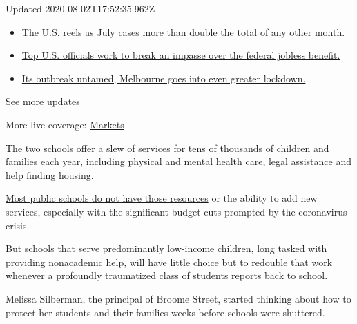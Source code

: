 Updated 2020-08-02T17:52:35.962Z

\begin{itemize}
\tightlist
\item
  \href{https://www.nytimes3xbfgragh.onion/2020/08/01/world/coronavirus-covid-19.html?action=click\&pgtype=Article\&state=default\&region=MAIN_CONTENT_1\&context=storylines_live_updates\#link-34047410}{The
  U.S. reels as July cases more than double the total of any other
  month.}
\item
  \href{https://www.nytimes3xbfgragh.onion/2020/08/01/world/coronavirus-covid-19.html?action=click\&pgtype=Article\&state=default\&region=MAIN_CONTENT_1\&context=storylines_live_updates\#link-780ec966}{Top
  U.S. officials work to break an impasse over the federal jobless
  benefit.}
\item
  \href{https://www.nytimes3xbfgragh.onion/2020/08/01/world/coronavirus-covid-19.html?action=click\&pgtype=Article\&state=default\&region=MAIN_CONTENT_1\&context=storylines_live_updates\#link-2bc8948}{Its
  outbreak untamed, Melbourne goes into even greater lockdown.}
\end{itemize}

\href{https://www.nytimes3xbfgragh.onion/2020/08/01/world/coronavirus-covid-19.html?action=click\&pgtype=Article\&state=default\&region=MAIN_CONTENT_1\&context=storylines_live_updates}{See
more updates}

More live coverage:
\href{https://www.nytimes3xbfgragh.onion/live/2020/07/31/business/stock-market-today-coronavirus?action=click\&pgtype=Article\&state=default\&region=MAIN_CONTENT_1\&context=storylines_live_updates}{Markets}

The two schools offer a slew of services for tens of thousands of
children and families each year, including physical and mental health
care, legal assistance and help finding housing.

\href{https://www.nytimes3xbfgragh.onion/2020/07/14/us/coronavirus-schools-fall.html}{Most
public schools do not have those resources} or the ability to add new
services, especially with the significant budget cuts prompted by the
coronavirus crisis.

But schools that serve predominantly low-income children, long tasked
with providing nonacademic help, will have little choice but to redouble
that work whenever a profoundly traumatized class of students reports
back to school.

Melissa Silberman, the principal of Broome Street, started thinking
about how to protect her students and their families weeks before
schools were shuttered.

